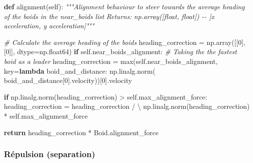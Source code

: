 \documentclass[
]{article}
\newenvironment{Shaded}{}{}
\newcommand{\BuiltInTok}[1]{#1}
\newcommand{\CommentTok}[1]{\textcolor[rgb]{0.38,0.63,0.69}{\textit{#1}}}
\newcommand{\ControlFlowTok}[1]{\textcolor[rgb]{0.00,0.44,0.13}{\textbf{#1}}}
\newcommand{\DecValTok}[1]{\textcolor[rgb]{0.25,0.63,0.44}{#1}}
\newcommand{\KeywordTok}[1]{\textcolor[rgb]{0.00,0.44,0.13}{\textbf{#1}}}
\newcommand{\NormalTok}[1]{#1}
\newcommand{\OperatorTok}[1]{\textcolor[rgb]{0.40,0.40,0.40}{#1}}
\newcommand{\VariableTok}[1]{\textcolor[rgb]{0.10,0.09,0.49}{#1}}
\begin{document}
\begin{Shaded}
\begin{Highlighting}[]
\KeywordTok{def}\NormalTok{ alignment(}\VariableTok{self}\NormalTok{):}
    \CommentTok{"""Alignment behaviour to steer towards the average heading of the boids in the near\_boids list}
\CommentTok{    Returns:}
\CommentTok{        np.array([float, float]) {-}{-} [x acceleration, y acceleration]"""}

    \CommentTok{\# Calculate the average heading of the boids}
\NormalTok{    heading\_correction }\OperatorTok{=}\NormalTok{ np.array([[}\DecValTok{0}\NormalTok{], [}\DecValTok{0}\NormalTok{]], dtype}\OperatorTok{=}\NormalTok{np.float64)}
    \ControlFlowTok{if} \VariableTok{self}\NormalTok{.near\_boids\_alignment:}
        \CommentTok{\# Taking the the fastest boid as a leader}
\NormalTok{        heading\_correction }\OperatorTok{=} \BuiltInTok{max}\NormalTok{(}\VariableTok{self}\NormalTok{.near\_boids\_alignment, key}\OperatorTok{=}\KeywordTok{lambda}\NormalTok{ boid\_and\_distance: np.linalg.norm(}
\NormalTok{            boid\_and\_distance[}\DecValTok{0}\NormalTok{].velocity))[}\DecValTok{0}\NormalTok{].velocity}

    \ControlFlowTok{if}\NormalTok{ np.linalg.norm(heading\_correction) }\OperatorTok{\textgreater{}} \VariableTok{self}\NormalTok{.max\_alignment\_force:}
\NormalTok{        heading\_correction }\OperatorTok{=}\NormalTok{ heading\_correction }\OperatorTok{/} \OperatorTok{\textbackslash{}}
\NormalTok{            np.linalg.norm(heading\_correction) }\OperatorTok{*} \VariableTok{self}\NormalTok{.max\_alignment\_force}

    \ControlFlowTok{return}\NormalTok{ heading\_correction }\OperatorTok{*}\NormalTok{ Boid.alignment\_force}
\end{Highlighting}
\end{Shaded}

\hypertarget{ruxe9pulsion-separation}{%
\subsubsection{Répulsion (separation)}\label{ruxe9pulsion-separation}}
\end{document}
